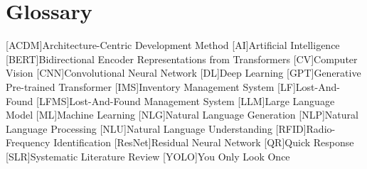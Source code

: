 \chapter{Glossary}

\footnotesize
\DoubleSpacing

\begin{acronym}[ai]
	[ACDM]{Architecture-Centric Development Method}
	[AI]{Artificial Intelligence}
	[BERT]{Bidirectional Encoder Representations from Transformers}
	[CV]{Computer Vision}
	[CNN]{Convolutional Neural Network}
	[DL]{Deep Learning}
	[GPT]{Generative Pre-trained Transformer}
	[IMS]{Inventory Management System}
	[LF]{Lost-And-Found}
	[LFMS]{Lost-And-Found Management System}
	[LLM]{Large Language Model}
	[ML]{Machine Learning}
	[NLG]{Natural Language Generation}
	[NLP]{Natural Language Processing}
	[NLU]{Natural Language Understanding}
	[RFID]{Radio-Frequency Identification}
	[ResNet]{Residual Neural Network}
	[QR]{Quick Response}
	[SLR]{Systematic Literature Review}
	[YOLO]{You Only Look Once}
\end{acronym}


